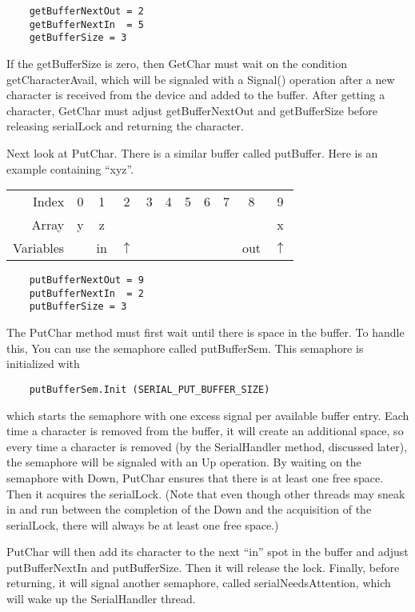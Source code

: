 \documentclass[11pt]{article}
\begin{document}
\begin{verbatim}
    getBufferNextOut = 2
    getBufferNextIn  = 5
    getBufferSize = 3
\end{verbatim}


If the getBufferSize is zero, then GetChar must wait on the condition
getCharacterAvail, which will be signaled with a Signal() operation
after a new character is received from the device and added to the
buffer.  After getting a character, GetChar must adjust
getBufferNextOut and getBufferSize before releasing serialLock and
returning the character.

Next look at PutChar.  There is a similar buffer called putBuffer.
Here is an example containing ``xyz''.

\vspace{.2in}

\begin{tabular}{r|c|c|c|c|c|c|c|c|c|c|}
Index &0&1&2&3&4&5&6&7&8&9 \\
\cline{2-11}
Array & y&z&&&&&&&&x \\
\cline {2-11}
Variables & & in & $\uparrow$ && & & &  & out & $\uparrow$ \\
\end{tabular}
 
\begin{verbatim}
    putBufferNextOut = 9
    putBufferNextIn  = 2
    putBufferSize = 3
\end{verbatim}

The PutChar method must first wait until there is space in the buffer.
To handle this, You can use the semaphore called putBufferSem.  This
semaphore is initialized with

\begin{verbatim}
    putBufferSem.Init (SERIAL_PUT_BUFFER_SIZE)
\end{verbatim}

which starts the semaphore with one excess signal per available buffer
entry.  Each time a character is removed from the buffer, it will
create an additional space, so every time a character is removed (by
the SerialHandler method, discussed later), the semaphore will be
signaled with an Up operation.  By waiting on the semaphore with Down,
PutChar ensures that there is at least one free space.  Then it
acquires the serialLock.  (Note that even though other threads may
sneak in and run between the completion of the Down and the
acquisition of the serialLock, there will always be at least one free
space.)

PutChar will then add its character to the next ``in'' spot in the
buffer and adjust putBufferNextIn and putBufferSize.  Then it will
release the lock.  Finally, before returning, it will signal another
semaphore, called serialNeedsAttention, which will wake up the
SerialHandler thread.
\end{document}

